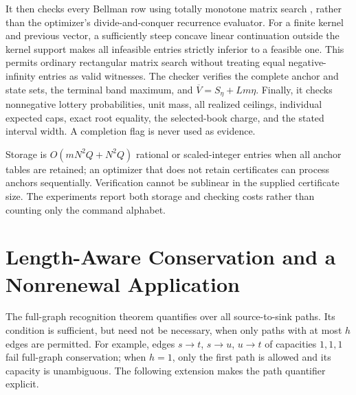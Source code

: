 \documentclass[11pt,letterpaper]{article}
\theoremstyle{definition}\newtheorem{remark}[theorem]{Remark}
\begin{document}
It then checks every Bellman row using totally monotone matrix search \citep{Aggarwal1987}, rather than the optimizer's divide-and-conquer recurrence evaluator. For a finite kernel and previous vector, a sufficiently steep concave linear continuation outside the kernel support makes all infeasible entries strictly inferior to a feasible one. This permits ordinary rectangular matrix search without treating equal negative-infinity entries as valid witnesses. The checker verifies the complete anchor and state sets, the terminal band maximum, and $\overline V=S_\eta+Lm\eta$. Finally, it checks nonnegative lottery probabilities, unit mass, all realized ceilings, individual expected caps, exact root equality, the selected-book charge, and the stated interval width. A completion flag is never used as evidence.

Storage is $O(mN^2Q+N^2Q)$ rational or scaled-integer entries when all anchor tables are retained; an optimizer that does not retain certificates can process anchors sequentially. Verification cannot be sublinear in the supplied certificate size. The experiments report both storage and checking costs rather than counting only the command alphabet.
\section{Length-Aware Conservation and a Nonrenewal Application}\label{sec:bounded60}
The full-graph recognition theorem quantifies over all source-to-sink paths. Its condition is sufficient, but need not be necessary, when only paths with at most $h$ edges are permitted. For example, edges $s\to t$, $s\to u$, $u\to t$ of capacities $1,1,1$ fail full-graph conservation; when $h=1$, only the first path is allowed and its capacity is unambiguous. The following extension makes the path quantifier explicit.
\end{document}
